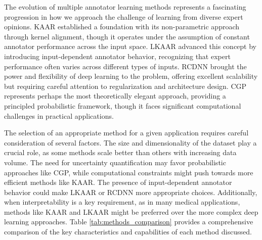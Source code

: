 The evolution of multiple annotator learning methods represents a
fascinating progression in how we approach the challenge of learning
from diverse expert opinions. KAAR established a foundation with its
non-parametric approach through kernel alignment, though it operates
under the assumption of constant annotator performance across the
input space. LKAAR advanced this concept by introducing
input-dependent annotator behavior, recognizing that expert
performance often varies across different types of inputs. RCDNN
brought the power and flexibility of deep learning to the problem,
offering excellent scalability but requiring careful attention to
regularization and architecture design. CGP represents perhaps the
most theoretically elegant approach, providing a principled
probabilistic framework, though it faces significant computational
challenges in practical applications.

The selection of an appropriate method for a given application
requires careful consideration of several factors. The size and
dimensionality of the dataset play a crucial role, as some methods
scale better than others with increasing data volume. The need for
uncertainty quantification may favor probabilistic approaches like
CGP, while computational constraints might push towards more
efficient methods like KAAR. The presence of input-dependent
annotator behavior could make LKAAR or RCDNN more appropriate
choices. Additionally, when interpretability is a key requirement, as
in many medical applications, methods like KAAR and LKAAR might be
preferred over the more complex deep learning approaches.
Table \ref{tab:methods_comparison} provides a comprehensive
comparison of the key characteristics and capabilities of each method discussed.

